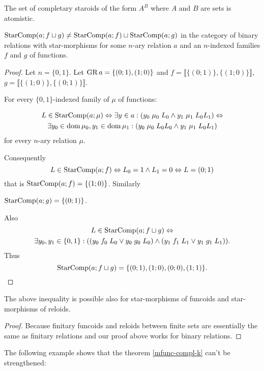 \begin{conjecture}
The set of completary staroids of the form $A^{B}$ where $A$ and
$B$ are sets is atomistic.\end{conjecture}
\begin{example}
$\operatorname{StarComp}(a;f\sqcup g)\neq\operatorname{StarComp}(a;f)\sqcup\operatorname{StarComp}(a;g)$ in
the category of binary relations with star-morphisms for some $n$-ary
relation $a$ and an $n$-indexed families $f$ and $g$ of functions.\end{example}
\begin{proof}
Let $n=\{0,1\}$. Let $\operatorname{GR} a=\{(0;1),(1;0)\}$ and $f=\llbracket\{(0;1)\},\{(1;0)\}\rrbracket$,
$g=\llbracket\{(1;0)\},\{(0;1)\}\rrbracket$.

For every $\{0,1\}$-indexed family of $\mu$ of functions:

\begin{multline*}
L\in\operatorname{StarComp}(a;\mu)\Leftrightarrow\exists y\in a:(y_{0}\mathrel{\mu_{0}}L_{0}\wedge y_{1}\mathrel{\mu_{1}}L_{0}L_{1})\Leftrightarrow\\
\exists y_{0}\in\operatorname{dom}\mu_{0},y_{1}\in\operatorname{dom}\mu_{1}:(y_{0}\mathrel{\mu_{0}}L_{0}L_{0}\wedge y_{1}\mathrel{\mu_{1}}L_{0}L_{1})
\end{multline*}
 for every $n$-ary relation $\mu$.

Consequently 
\[
L\in\operatorname{StarComp}(a;f)\Leftrightarrow L_{0}=1\wedge L_{1}=0\Leftrightarrow L=(0;1)
\]
that is $\operatorname{StarComp}(a;f)=\{(1;0)\}$. Similarly

$\operatorname{StarComp}(a;g)=\{(0;1)\}$.

Also 
\begin{multline*}
L\in\operatorname{StarComp}(a;f\sqcup g)\Leftrightarrow\\
\exists y_{0},y_{1}\in\{0,1\}:((y_{0}\mathrel{f_{0}}L_{0}\vee y_{0}\mathrel{g_{0}}L_{0})\wedge(y_{1}\mathrel{f_{1}}L_{1}\vee y_{1}\mathrel{g_{1}}L_{1})).
\end{multline*}
Thus 
\[
\operatorname{StarComp}(a;f\sqcup g)=\{(0;1),(1;0),(0;0),(1;1)\}.
\]
\end{proof}
\begin{cor}
The above inequality is possible also for star-morphisms of funcoids
and star-morphisms of reloids.\end{cor}
\begin{proof}
Because finitary funcoids and reloids between finite sets are essentially
the same as finitary relations and our proof above works for binary
relations.
\end{proof}
The following example shows that the theorem \ref{mfunc-compl-k}
can't be strengthened:
